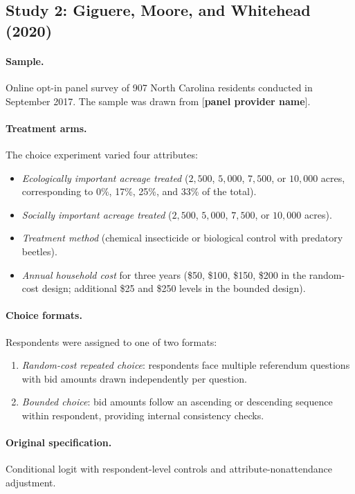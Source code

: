 \documentclass[12pt]{article}
\begin{document}
\subsection{Study 2: Giguere, Moore, and Whitehead (2020)}

\paragraph{Sample.} Online opt-in panel survey of 907 North Carolina residents conducted in September 2017. The sample was drawn from [\textbf{panel provider name}].

\paragraph{Treatment arms.} The choice experiment varied four attributes:
\begin{itemize}[noitemsep]
    \item \textit{Ecologically important acreage treated} ($2{,}500$, $5{,}000$, $7{,}500$, or $10{,}000$ acres, corresponding to 0\%, 17\%, 25\%, and 33\% of the total).
    \item \textit{Socially important acreage treated} ($2{,}500$, $5{,}000$, $7{,}500$, or $10{,}000$ acres).
    \item \textit{Treatment method} (chemical insecticide or biological control with predatory beetles).
    \item \textit{Annual household cost} for three years (\$50, \$100, \$150, \$200 in the random-cost design; additional \$25 and \$250 levels in the bounded design).
\end{itemize}

\paragraph{Choice formats.} Respondents were assigned to one of two formats:
\begin{enumerate}[noitemsep]
    \item \textit{Random-cost repeated choice}: respondents face multiple referendum questions with bid amounts drawn independently per question.
    \item \textit{Bounded choice}: bid amounts follow an ascending or descending sequence within respondent, providing internal consistency checks.
\end{enumerate}

\paragraph{Original specification.} Conditional logit with respondent-level controls and attribute-nonattendance adjustment.
\end{document}
